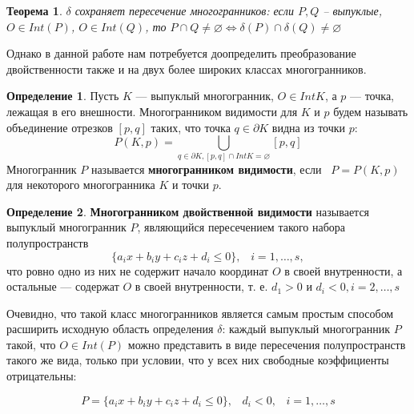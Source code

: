 \documentclass[a4paper, 10pt]{article}
\theoremstyle{definition}
\newtheorem{SmartDefinition}{Определение}
\theoremstyle{plain}
\newtheorem{SmartTheorem}{Теорема}
\theoremstyle{plain}
\begin{document}
\begin{SmartTheorem}
\label{theorem:intersection-saving}
 $\delta$ сохраняет пересечение многогранников: если $P, Q$ -- выпуклые,
 $O \in Int(P)$, $O \in Int(Q)$, то
 $P \cap Q \neq \varnothing \Leftrightarrow
 \delta(P) \cap \delta(Q) \neq \varnothing$
\end{SmartTheorem}

Однако в данной работе нам потребуется доопределить преобразование
двойственности также и на двух более широких классах многогранников.

\begin{SmartDefinition}
 Пусть $K$ --- выпуклый многогранник, $O \in Int K$, а $p$ --- точка, лежащая в
 его внешности. Многогранником видимости для $K$ и $p$ будем называть
 объединение отрезков $[p, q]$ таких, что точка $q \in \partial K$ видна из
 точки $p$:
 \begin{equation}
  P(K, p) = \bigcup \limits_{q \in \partial K, [p, q] \cap Int K = \varnothing}
  [p, q]
 \end{equation}
Многогранник $P$ называется \textbf{многогранником видимости}, если \
$P = P(K, p)$ для некоторого многогранника $K$ и точки $p$.
\end{SmartDefinition}

\begin{SmartDefinition}
 \textbf{Многогранником двойственной видимости} называется выпуклый
 многогранник $P$, являющийся пересечением такого набора полупространств
 \begin{equation}
 \label{equation:halfspace}
  \{a_{i} x + b_{i} y + c_{i} z + d_{i} \leq 0 \}, \;\;\; i = 1, \ldots, s,
 \end{equation}
 что ровно одно из них не содержит начало координат $O$ в своей внутренности, а
 остальные --- содержат $O$ в своей внутренности, т. е. $d_{1} > 0$ и
 $d_{i} < 0, i = 2, \ldots, s$
\end{SmartDefinition}

Очевидно, что такой класс многогранников является самым простым способом
расширить исходную область определения $\delta$: каждый выпуклый многогранник
$P$ такой, что $O \in Int(P)$ можно представить в виде пересечения
полупространств такого же вида, только при условии, что у всех них свободные
коэффициенты отрицательны:

\begin{equation}
 P = \{a_{i} x + b_{i} y + c_{i} z + d_{i} \leq 0 \}, \;\;\;
 d_{i} < 0, \;\;\;
 i = 1, \ldots, s
\end{equation}
\end{document}
